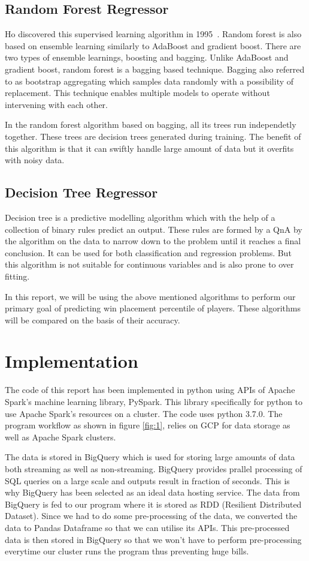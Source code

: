 \documentclass[journal,twoside,web]{ieeecolor}
\begin{document}
\subsection{Random Forest Regressor}
Ho discovered this supervised learning algorithm in 1995~\cite{tin_kam_ho_random_1995}. Random forest is also based on ensemble learning similarly to AdaBoost and gradient boost. There are two types of ensemble learnings, boosting and bagging. Unlike AdaBoost and gradient boost, random forest is a bagging based technique. Bagging also referred to as bootstrap aggregating which samples data randomly with a possibility of replacement. This technique enables multiple models to operate without intervening with each other.

In the random forest algorithm based on bagging, all its trees run independetly together. These trees are decision trees generated during training. The benefit of this algorithm is that it can swiftly handle large amount of data but it overfits with noisy data.

\subsection{Decision Tree Regressor}
Decision tree is a predictive modelling algorithm which with the help of a collection of binary rules predict an output. These rules are formed by a QnA by the algorithm on the data to narrow down to the problem until it reaches a final conclusion. It can be used for both classification and regression problems. But this algorithm is not suitable for continuous variables and is also prone to over fitting.

In this report, we will be using the above mentioned algorithms to perform our primary goal of predicting win placement percentile of players. These algorithms will be compared on the basis of their accuracy.

\section{Implementation}
\label{sec:implementation}
The code of this report has been implemented in python using APIs of Apache Spark's machine learning library, PySpark. This library specifically for python to use Apache Spark's resources on a cluster. The code uses python 3.7.0. The program workflow as shown in figure \ref{fig:1}, relies on GCP for data storage as well as Apache Spark clusters.

The data is stored in BigQuery which is used for storing large amounts of data both streaming as well as non-streaming. BigQuery provides prallel processing of SQL queries on a large scale and outputs result in fraction of seconds. This is why BigQuery has been selected as an ideal data hosting service. The data from BigQuery is fed to our program where it is stored as RDD (Resilient Distributed Dataset). Since we had to do some pre-processing of the data, we converted the data to Pandas Dataframe so that we can utilise its APIs. This pre-processed data is then stored in BigQuery so that we won't have to perform pre-processing everytime our cluster runs the program thus preventing huge bills.
\end{document}
